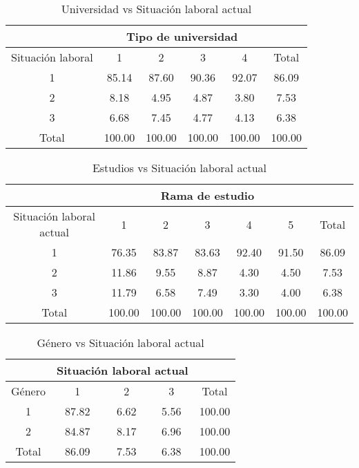 \documentclass{article}
\begin{document}
\begin{table}[]
\centering
\caption{Universidad vs Situación laboral actual}
\begin{tabular}{c|cccc|c} \hline   \hline  
         & \multicolumn{4}{c}{Tipo de universidad}                           &        \\ \hline  
Situación laboral  & 1       & 2      & 3      & 4       & Total  \\ \hline  
1        & 85.14   & 87.60  & 90.36  & 92.07   & 86.09  \\
2        & 8.18    & 4.95   & 4.87   & 3.80    & 7.53   \\
3        & 6.68    & 7.45   & 4.77   & 4.13    & 6.38   \\
Total    & 100.00  & 100.00 & 100.00 & 100.00  & 100.00 \\ \hline   \hline  
\end{tabular}
\end{table}

\begin{table}[]
\centering
\caption{Estudios vs Situación laboral actual}
\begin{tabular}{c|ccccc|c} \hline   \hline  
         & \multicolumn{5}{c}{Rama de estudio}                     &        \\ \hline  
Situación laboral actual  & 1      & 2      & 3      & 4      & 5       & Total  \\ \hline  
1        & 76.35  & 83.87  & 83.63  & 92.40  & 91.50   & 86.09  \\
2        & 11.86  & 9.55   & 8.87   & 4.30   & 4.50    & 7.53   \\
3        & 11.79  & 6.58   & 7.49   & 3.30   & 4.00    & 6.38   \\ \hline
Total    & 100.00 & 100.00 & 100.00 & 100.00 & 100.00  & 100.00 \\ \hline  \hline  
\end{tabular}
\end{table}

\begin{table}[]
\centering
\caption{Género vs Situación laboral actual}
\begin{tabular}{c|ccc|c} \hline   \hline  
       & \multicolumn{3}{c}{Situación laboral actual}         &        \\ \hline  
Género   & 1       & 2    & 3     & Total  \\ \hline  
1      & 87.82   & 6.62 & 5.56  & 100.00 \\
2      & 84.87   & 8.17 & 6.96  & 100.00 \\ 
Total  & 86.09   & 7.53 & 6.38  & 100.00 \\ \hline   \hline  
\end{tabular}
\end{table}
\end{document}

